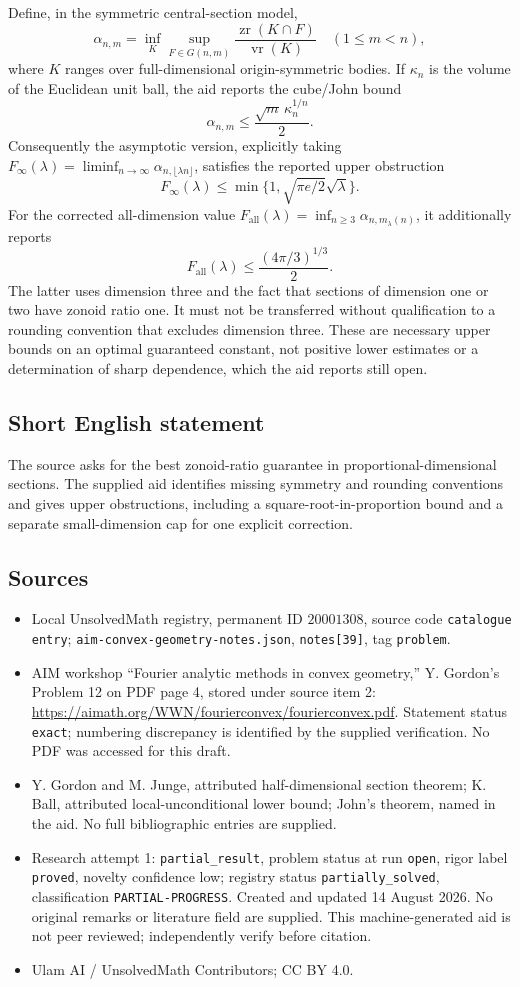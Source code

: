 \documentclass[11pt]{article}
\begin{document}
Define, in the symmetric central-section model,
\[
 \alpha_{n,m}=\inf_K\sup_{F\in G(n,m)}
 \frac{\operatorname{zr}(K\cap F)}{\operatorname{vr}(K)}
 \quad(1\le m<n),
\]
where \(K\) ranges over full-dimensional origin-symmetric bodies. If \(\kappa_n\) is the volume of the Euclidean unit ball, the aid reports the cube/John bound
\[
 \alpha_{n,m}\le\frac{\sqrt m\,\kappa_n^{1/n}}2.
\]
Consequently the asymptotic version, explicitly taking
\(F_\infty(\lambda)=\liminf_{n\to\infty}\alpha_{n,\lfloor\lambda n\rfloor}\), satisfies the reported upper obstruction
\[
 F_\infty(\lambda)\le
 \min\{1,\sqrt{\pi e/2}\sqrt\lambda\}.
\]
For the corrected all-dimension value
\(F_{\mathrm{all}}(\lambda)=\inf_{n\ge3}\alpha_{n,m_\lambda(n)}\), it additionally reports
\[
 F_{\mathrm{all}}(\lambda)\le\frac{(4\pi/3)^{1/3}}2.
\]
The latter uses dimension three and the fact that sections of dimension one or two have zonoid ratio one. It must not be transferred without qualification to a rounding convention that excludes dimension three. These are necessary upper bounds on an optimal guaranteed constant, not positive lower estimates or a determination of sharp dependence, which the aid reports still open.
\subsection{Short English statement}
The source asks for the best zonoid-ratio guarantee in proportional-dimensional sections. The supplied aid identifies missing symmetry and rounding conventions and gives upper obstructions, including a square-root-in-proportion bound and a separate small-dimension cap for one explicit correction.
\subsection{Sources}
\begin{itemize}
\item Local UnsolvedMath registry, permanent ID \(20001308\), source code \texttt{catalogue entry}; \texttt{aim-convex-geometry-notes.json}, \texttt{notes[39]}, tag \texttt{problem}.
\item AIM workshop ``Fourier analytic methods in convex geometry,'' Y. Gordon's Problem 12 on PDF page 4, stored under source item 2: \url{https://aimath.org/WWN/fourierconvex/fourierconvex.pdf}. Statement status \texttt{exact}; numbering discrepancy is identified by the supplied verification. No PDF was accessed for this draft.
\item Y. Gordon and M. Junge, attributed half-dimensional section theorem; K. Ball, attributed local-unconditional lower bound; John's theorem, named in the aid. No full bibliographic entries are supplied.
\item Research attempt 1: \texttt{partial\_result}, problem status at run \texttt{open}, rigor label \texttt{proved}, novelty confidence low; registry status \texttt{partially\_solved}, classification \texttt{PARTIAL-PROGRESS}. Created and updated 14 August 2026. No original remarks or literature field are supplied. This machine-generated aid is not peer reviewed; independently verify before citation.
\item Ulam AI / UnsolvedMath Contributors; CC BY 4.0.
\end{itemize}
\end{document}
